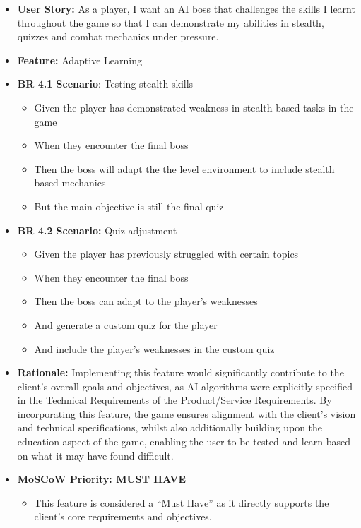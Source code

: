 \documentclass[11pt, a4paper]{article}
\begin{document}
\begin{itemize}
    \item \textbf{User Story:} As a player, I want an AI boss that challenges the skills I learnt throughout the game so that I can demonstrate my abilities in stealth, quizzes and combat mechanics under pressure.

    \item \textbf{Feature:} Adaptive Learning

    \item \textbf{BR 4.1 Scenario}: Testing stealth skills

          \begin{itemize}
              \item Given the player has demonstrated weakness in stealth based tasks in the game
              \item When they encounter the final boss
              \item Then the boss will adapt the the level environment to include stealth based mechanics
              \item But the main objective is still the final quiz
          \end{itemize}

    \item \textbf{BR 4.2 Scenario:} Quiz adjustment

          \begin{itemize}
              \item Given the player has previously struggled with certain topics
              \item When they encounter the final boss
              \item Then the boss can adapt to the player’s weaknesses
              \item And generate a custom quiz for the player
              \item And include the player’s weaknesses in the custom quiz
          \end{itemize}

    \item \textbf{Rationale:} Implementing this feature would significantly contribute to the client’s overall goals and objectives, as AI algorithms were explicitly specified in the Technical Requirements of the Product/Service Requirements. By incorporating this feature, the game ensures alignment with the client’s vision and technical specifications, whilst also additionally building upon the education aspect of the game, enabling the user to be tested and learn based on what it may have found difficult.

    \item \textbf{MoSCoW Priority: MUST HAVE}

          \begin{itemize}
              \item This feature is considered a “Must Have” as it directly supports the client’s core requirements and objectives.
          \end{itemize}
\end{itemize}
\end{document}
